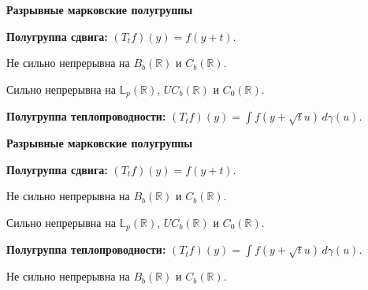 \documentclass[11pt]{article}
\newcommand{\R}{\mathbb{R}}
\newcommand{\Lp}{\mathbb{L}}
\begin{document}
\newpage

\begin{center}
{\color{notaeYELLOW}\bfseries\fontsize{44}{52}\selectfont Разрывные марковские полугруппы}
\end{center}
\vspace*{\fill}
\begin{center}
\fontsize{36}{43}\selectfont
\parbox{\linewidth}{\centering\noindent \textbf{Полугруппа сдвига:} $(T_t f)(y)=f(y+t)$.
\par}\vspace{0.4in}
\parbox{\linewidth}{\centering\noindent Не сильно непрерывна на $B_b(\R)$ и $C_b(\R)$.
\par}\vspace{0.4in}
\parbox{\linewidth}{\centering\noindent Сильно непрерывна на $\Lp_p(\R)$, $UC_b(\R)$ и $C_0(\R)$.
\par}\vspace{0.4in}
\parbox{\linewidth}{\centering\noindent \textbf{Полугруппа теплопроводности:} $(T_t f)(y)=\int f(y+\sqrt{t}u)\,d\gamma(u)$.
\par}\vspace{0.4in}
\end{center}
\vspace*{\fill}

\newpage

\begin{center}
{\color{notaeYELLOW}\bfseries\fontsize{44}{52}\selectfont Разрывные марковские полугруппы}
\end{center}
\vspace*{\fill}
\begin{center}
\fontsize{36}{43}\selectfont
\parbox{\linewidth}{\centering\noindent \textbf{Полугруппа сдвига:} $(T_t f)(y)=f(y+t)$.
\par}\vspace{0.4in}
\parbox{\linewidth}{\centering\noindent Не сильно непрерывна на $B_b(\R)$ и $C_b(\R)$.
\par}\vspace{0.4in}
\parbox{\linewidth}{\centering\noindent Сильно непрерывна на $\Lp_p(\R)$, $UC_b(\R)$ и $C_0(\R)$.
\par}\vspace{0.4in}
\parbox{\linewidth}{\centering\noindent \textbf{Полугруппа теплопроводности:} $(T_t f)(y)=\int f(y+\sqrt{t}u)\,d\gamma(u)$.
\par}\vspace{0.4in}
\parbox{\linewidth}{\centering\noindent Не сильно непрерывна на $B_b(\R)$ и $C_b(\R)$.
\par}\vspace{0.4in}
\end{center}
\vspace*{\fill}
\end{document}

